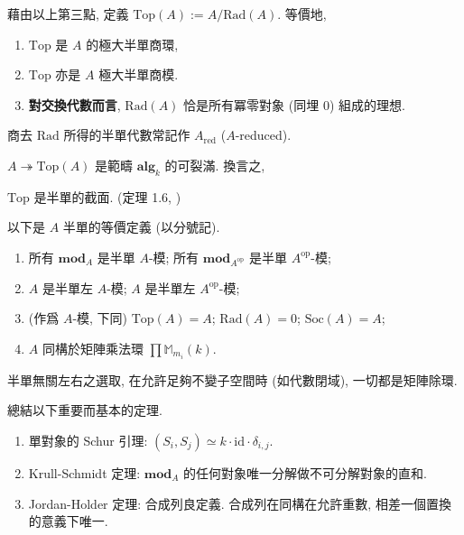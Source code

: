 \begin{definition}[頂]\label{Top}
    藉由以上第三點, 定義 $\mathrm{Top}(A):=A / \mathrm{Rad}(A)$. 等價地, 
    \begin{enumerate}
        \item $\mathrm{Top}$ 是 $A$ 的極大半單商環,
        \item $\mathrm{Top}$ 亦是 $A$ 極大半單商模.
        \item \textbf{對交換代數而言}, $\mathrm{Rad}(A)$ 恰是所有冪零對象 (同埋 $0$) 組成的理想. 
    \end{enumerate}
    商去 $\mathrm{Rad}$ 所得的半單代數常記作 $A_\mathrm{red}$ ($A$-reduced). 
\end{definition}

\begin{theorem}
    $A ↠ \mathrm{Top}(A)$ 是範疇 $𝐚𝐥𝐠_k$ 的可裂滿. 換言之, 
    \begin{pinked}
        $\mathrm{Top}$ 是半單的截面. (定理 1.6, \cite{e1})
    \end{pinked}
\end{theorem}

\begin{proposition}
    以下是 $A$ 半單的等價定義 (以分號記). 
\begin{enumerate}
    \item 所有 $𝐦𝐨𝐝_A$ 是半單 $A$-模; 所有 $𝐦𝐨𝐝_{A^{\mathrm{op}}}$ 是半單 $A^{\mathrm{op}}$-模;
    \item $A$ 是半單左 $A$-模; $A$ 是半單左 $A^{\mathrm{op}}$-模;
    \item (作爲 $A$-模, 下同) $\mathrm{Top}(A) = A$; $\mathrm{Rad}(A) = 0$; $\mathrm{Soc}(A) = A$;
    \item $A$ 同構於矩陣乘法環 $∏ 𝕄_{m_i}(k)$.
\end{enumerate}
\begin{pinked}
    半單無關左右之選取, 在允許足夠不變子空間時 (如代數閉域), 一切都是矩陣除環.
\end{pinked}
\end{proposition}

\begin{proposition}[回顧模半單性]\label{semisimple}
    總結以下重要而基本的定理. 
    \begin{enumerate}
        \item 單對象的 Schur 引理: $(S_i , S_j ) ≃ k ⋅ \mathrm{id}⋅ δ _{i,j}$. 
        \item Krull-Schmidt 定理: $𝐦𝐨𝐝_A$ 的任何對象唯一分解做不可分解對象的直和. 
        \item Jordan-Holder 定理: 合成列良定義. 合成列在同構在允許重數, 相差一個置換的意義下唯一. 
    \end{enumerate} 
\end{proposition}

